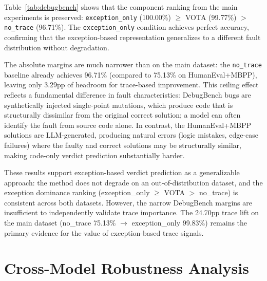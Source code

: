 Table~\ref{tab:debugbench} shows that the component ranking from the main experiments is preserved: \texttt{exception\_only} (100.00\%) $\geq$ VOTA (99.77\%) $>$ \texttt{no\_trace} (96.71\%).
The \texttt{exception\_only} condition achieves perfect accuracy, confirming that the exception-based representation generalizes to a different fault distribution without degradation.

The absolute margins are much narrower than on the main dataset: the \texttt{no\_trace} baseline already achieves 96.71\% (compared to 75.13\% on HumanEval+MBPP), leaving only 3.29pp of headroom for trace-based improvement.
This ceiling effect reflects a fundamental difference in fault characteristics: DebugBench bugs are synthetically injected single-point mutations, which produce code that is structurally dissimilar from the original correct solution; a model can often identify the fault from source code alone.
In contrast, the HumanEval+MBPP solutions are LLM-generated, producing natural errors (logic mistakes, edge-case failures) where the faulty and correct solutions may be structurally similar, making code-only verdict prediction substantially harder.

These results support exception-based verdict prediction as a generalizable approach: the method does not degrade on an out-of-distribution dataset, and the exception dominance ranking (exception\_only $\geq$ VOTA $>$ no\_trace) is consistent across both datasets. However, the narrow DebugBench margins are insufficient to independently validate trace importance.
The 24.70pp trace lift on the main dataset (no\_trace 75.13\% $\to$ exception\_only 99.83\%) remains the primary evidence for the value of exception-based trace signals.

\section{Cross-Model Robustness Analysis}
\label{sec:robustness_analysis}

